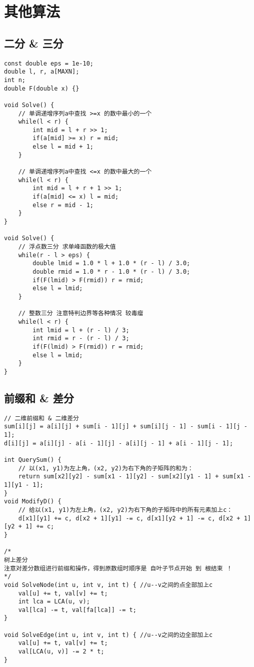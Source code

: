\section{其他算法}

\subsection{二分 \& 三分}
\begin{lstlisting}
const double eps = 1e-10;
double l, r, a[MAXN];
int n;
double F(double x) {}

void Solve() {
	// 单调递增序列a中查找 >=x 的数中最小的一个 
	while(l < r) {
		int mid = l + r >> 1;
		if(a[mid] >= x) r = mid;
		else l = mid + 1;
	}
	
	// 单调递增序列a中查找 <=x 的数中最大的一个
	while(l < r) {
		int mid = l + r + 1 >> 1;
		if(a[mid] <= x) l = mid;
		else r = mid - 1;
	}
}

void Solve() {	
	// 浮点数三分 求单峰函数的极大值
	while(r - l > eps) {
		double lmid = 1.0 * l + 1.0 * (r - l) / 3.0;
		double rmid = 1.0 * r - 1.0 * (r - l) / 3.0;
		if(F(lmid) > F(rmid)) r = rmid;
		else l = lmid;
	}
	
	// 整数三分 注意特判边界等各种情况 较毒瘤
	while(l < r) {
		int lmid = l + (r - l) / 3;
		int rmid = r - (r - l) / 3;
		if(F(lmid) > F(rmid)) r = rmid;
		else l = lmid;		
	}
}
\end{lstlisting}

\subsection{前缀和 \& 差分}
\begin{lstlisting}
// 二维前缀和 & 二维差分
sum[i][j] = a[i][j] + sum[i - 1][j] + sum[i][j - 1] - sum[i - 1][j - 1];
d[i][j] = a[i][j] - a[i - 1][j] - a[i][j - 1] + a[i - 1][j - 1];

int QuerySum() {
	// 以(x1, y1)为左上角，(x2, y2)为右下角的子矩阵的和为：
	return sum[x2][y2] - sum[x1 - 1][y2] - sum[x2][y1 - 1] + sum[x1 - 1][y1 - 1];
}
void ModifyD() {
	// 给以(x1, y1)为左上角，(x2, y2)为右下角的子矩阵中的所有元素加上c：
	d[x1][y1] += c, d[x2 + 1][y1] -= c, d[x1][y2 + 1] -= c, d[x2 + 1][y2 + 1] += c;
}

/*
树上差分
注意对差分数组进行前缀和操作，得到原数组时顺序是 自叶子节点开始 到 根结束 ！
*/
void SolveNode(int u, int v, int t) { //u--v之间的点全部加上c
	val[u] += t, val[v] += t;
	int lca = LCA(u, v);
	val[lca] -= t, val[fa[lca]] -= t;
}

void SolveEdge(int u, int v, int t) { //u--v之间的边全部加上c
	val[u] += t, val[v] += t;
	val[LCA(u, v)] -= 2 * t;
}
\end{lstlisting}


